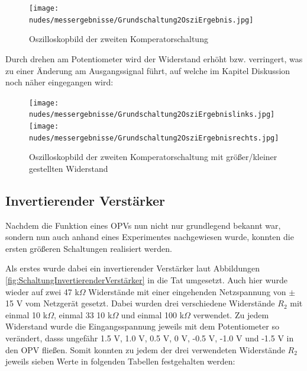 \documentclass[12pt,a4paper,twoside]{article}
\begin{document}
\begin{figure}[H]
    \centering
    \texttt{[image: nudes/messergebnisse/Grundschaltung2OsziErgebnis.jpg]}
    \caption{Oszilloskopbild der zweiten Komperatorschaltung}
    \label{fig:Grundschaltung2Ergebniss}
\end{figure}

\noindent
Durch drehen am Potentiometer wird der Widerstand erhöht bzw. verringert, was zu einer Änderung am Ausgangssignal führt, auf welche im Kapitel Diskussion noch näher eingegangen wird:

\begin{figure}[H]
    \centering
    \texttt{[image: nudes/messergebnisse/Grundschaltung2OsziErgebnislinks.jpg]}
    \texttt{[image: nudes/messergebnisse/Grundschaltung2OsziErgebnisrechts.jpg]}
    \caption{Oszilloskopbild der zweiten Komperatorschaltung mit größer/kleiner gestellten Widerstand}
    \label{fig:Grundschaltung2ErgebnissPoti}
\end{figure}

\subsection{Invertierender Verstärker}

Nachdem die Funktion eines OPVs nun nicht nur grundlegend bekannt war, sondern nun auch anhand eines Experimentes nachgewiesen wurde, konnten die ersten größeren Schaltungen realisiert werden. \newline

\noindent
Als erstes wurde dabei ein invertierender Verstärker laut Abbildungen \ref{fig:SchaltungInvertierenderVerstärker} in die Tat umgesetzt. Auch hier wurde wieder auf zwei 47 k$\Omega$ Widerstände mit einer eingehenden Netzspannung von $\pm$ 15 V vom Netzgerät gesetzt.
Dabei wurden drei verschiedene Widerstände $R_{2}$ mit einmal 10 k$\Omega$, einmal 33 10 k$\Omega$ und einmal 100 k$\Omega$ verwendet. Zu jedem Widerstand wurde die Eingangsspannung jeweils mit dem Potentiometer so verändert, dasss ungefähr 1.5 V, 1.0 V, 0.5 V, 0 V, -0.5 V, -1.0 V und -1.5 V in den OPV fließen. 
Somit konnten zu jedem der drei verwendeten Widerstände $R_{2}$ jeweils sieben Werte in folgenden Tabellen festgehalten werden:
\end{document}
